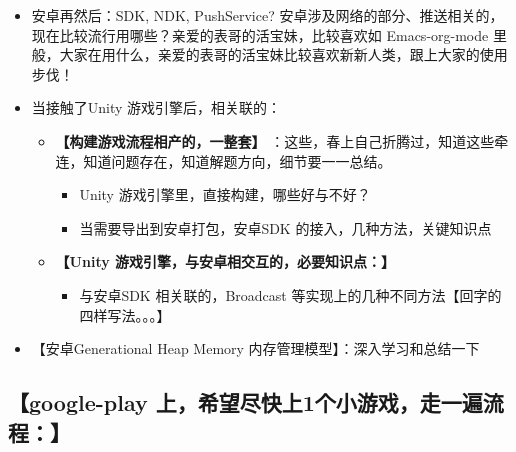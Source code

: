 \documentclass[9pt, b5paper]{article}
\begin{document}
\begin{itemize}
\begin{itemize}
\end{itemize}
\item 安卓再然后：SDK, NDK, PushService? 安卓涉及网络的部分、推送相关的，现在比较流行用哪些？亲爱的表哥的活宝妹，比较喜欢如 Emacs-org-mode 里般，大家在用什么，亲爱的表哥的活宝妹比较喜欢新新人类，跟上大家的使用步伐！
\item 当接触了Unity 游戏引擎后，相关联的： 
\begin{itemize}
\item \textbf{【构建游戏流程相产的，一整套】} ：这些，春上自己折腾过，知道这些牵连，知道问题存在，知道解题方向，细节要一一总结。
\begin{itemize}
\item Unity 游戏引擎里，直接构建，哪些好与不好？
\item 当需要导出到安卓打包，安卓SDK 的接入，几种方法，关键知识点
\end{itemize}
\item \textbf{【Unity 游戏引擎，与安卓相交互的，必要知识点：】}
\begin{itemize}
\item 与安卓SDK 相关联的，Broadcast 等实现上的几种不同方法【回字的四样写法。。。】
\end{itemize}
\end{itemize}
\item 【安卓Generational Heap Memory 内存管理模型】：深入学习和总结一下
\end{itemize}
\subsection{\textbf{【google-play 上，希望尽快上1个小游戏，走一遍流程：】}}
\label{sec-1-4}
\end{document}
